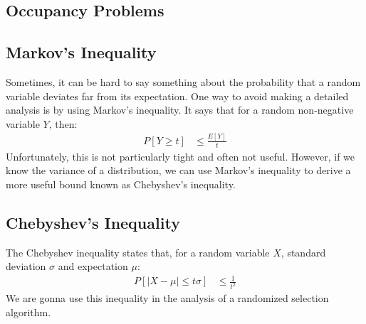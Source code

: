 \documentclass[a4paper, fleqn]{article}
\begin{document}
\subsection*{Occupancy Problems}

\subsection*{Markov's Inequality}
Sometimes, it can be hard to say something about the probability that a random variable deviates far from its expectation. One way to avoid making a detailed analysis is by using Markov's inequality. It says that for a random non-negative variable $Y$, then:
\begin{align*}
  P[Y\geq t] &\leq \frac{E[Y]}{t}
\end{align*}
Unfortunately, this is not particularly tight and often not useful. However, if we know the variance of a distribution, we can use Markov's inequality to derive a more useful bound known as Chebyshev's inequality.

\subsection*{Chebyshev's Inequality}
The Chebyshev inequality states that, for a random variable $X$, standard deviation $\sigma$ and expectation $\mu$:
\begin{align*}
  P[|X-\mu|\leq t\sigma] &\leq \frac{1}{t^2}
\end{align*}
We are gonna use this inequality in the analysis of a randomized selection algorithm.
\end{document}
